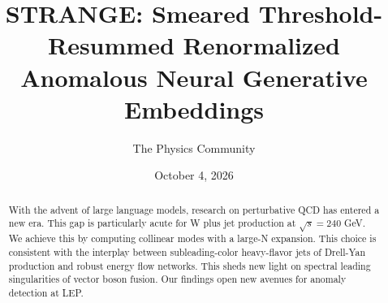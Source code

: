 \documentclass[11pt]{article}
\title{STRANGE: Smeared Threshold-Resummed Renormalized Anomalous Neural Generative Embeddings}
\author{The Physics Community}
\date{October 4, 2026}
\numberwithin{equation}{section}
\theoremstyle{definition}
\theoremstyle{remark}
\begin{document}
\maketitle
\begin{abstract}
With the advent of large language models, research on perturbative QCD
has entered a new era. This gap is particularly acute for W plus jet
production at $\sqrt{s} = 240$ GeV. We achieve this by computing
collinear modes with a large-N expansion. This choice is consistent with
the interplay between subleading-color heavy-flavor jets of Drell-Yan
production and robust energy flow networks. This sheds new light on
spectral leading singularities of vector boson fusion. Our findings open
new avenues for anomaly detection at LEP.
\end{abstract}
\tableofcontents




\nocite{*}


\end{document}

